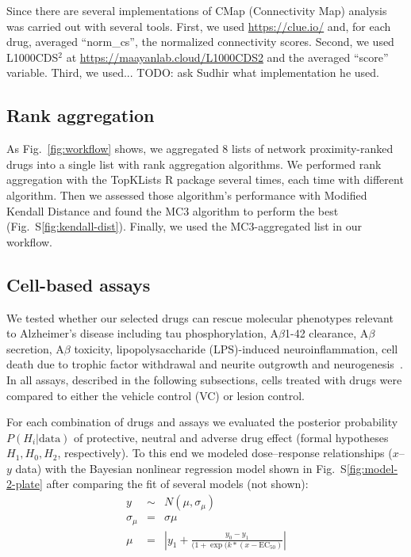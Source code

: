 \documentclass[letterpaper]{article}
\begin{document}
Since there are several implementations of CMap (Connectivity Map) analysis was carried out with several tools.  First, we used
\url{https://clue.io/} \citep{Lamb2006} and, for each drug, averaged
``norm\_cs'',
the normalized connectivity scores.  Second, we used L1000CDS$^2$ at
\url{https://maayanlab.cloud/L1000CDS2} and the averaged ``score'' variable.
Third, we used... TODO: ask Sudhir what implementation he used.

\subsection{Rank aggregation}

As Fig.~\ref{fig:workflow} shows, we aggregated 8 lists of network
proximity-ranked drugs into a single list with rank aggregation algorithms.
We performed rank aggregation with the TopKLists R package
several times, each time with different algorithm.  Then we assessed those
algorithm's performance with Modified Kendall Distance and found the MC3
algorithm to perform the best (Fig.~S\ref{fig:kendall-dist}).  Finally, we
used the MC3-aggregated list in our workflow.

\subsection{Cell-based assays}

We tested whether our selected drugs can rescue molecular phenotypes relevant
to Alzheimer's disease including tau phosphorylation, A$\beta$1-42 clearance,
A$\beta$ secretion, A$\beta$ toxicity, lipopolysaccharide (LPS)-induced
neuroinflammation, cell death due to trophic factor withdrawal and neurite
outgrowth and neurogenesis~\citep{Varma2020,Desai2022a}. In all assays,
described in the following subsections, cells treated with drugs were compared to either the vehicle
control (VC) or lesion control.

For each combination of drugs and assays we evaluated the posterior
probability $P(H_i|\mathrm{data})$ of protective, neutral and adverse drug
effect (formal hypotheses $H_1, H_0, H_2$, respectively).  To this end we
modeled dose--response relationships ($x$--$y$ data) with the Bayesian nonlinear regression
model shown in Fig.~S\ref{fig:model-2-plate} after comparing the fit of several models (not shown):
\begin{eqnarray}
  \label{eq:model-2-a}
  y &\sim& N(\mu, \sigma_\mu) \\
  \label{eq:model-2-b}
  \sigma_\mu &=& \sigma \mu \\
  \label{eq:model-2-c}
  \mu &=& \left| y_1 + \frac{y_0 - y_1}{(1 + \exp(k * (x - \mathrm{EC}_{50})} \right|
\end{eqnarray}
\end{document}
